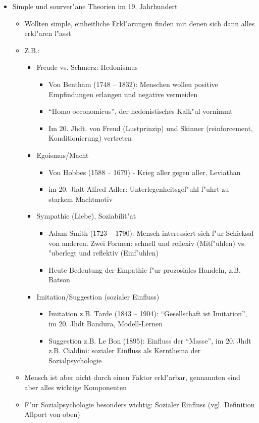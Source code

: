 \begin{itemize}
	\item
		Simple und sourver"ane Theorien im 19. Jahrhundert
		\begin{itemize}
			\item
				Wollten simple, einheitliche Erkl"arungen finden mit denen sich dann alles erkl"aren l"asst
			\item
				Z.B.:
				\begin{itemize}
					\item
						Freude vs. Schmerz: Hedonismus
						\begin{itemize}
							\item
								Von Bentham (1748 -- 1832): Menschen wollen positive Empfindungen erlangen und negative vermeiden
							\item
								\enquote{Homo oeconomicus}, der hedonistisches Kalk"ul vornimmt
							\item
								Im 20. Jhdt. von Freud (Lustprinzip) und Skinner (reinforcement, Konditionierung) vertreten
						\end{itemize}
					\item
						Egoismus/Macht
						\begin{itemize}
							\item
								Von Hobbes (1588 -- 1679) - Krieg aller gegen aller, Leviathan
							\item
								im 20. Jhdt Alfred Adler: Unterlegenheitsgef"uhl f"uhrt zu starkem Machtmotiv
						\end{itemize}
					\item
						Sympathie (Liebe), Soziabilit"at
						\begin{itemize}
							\item
								Adam Smith (1723 -- 1790): Mensch interessiert sich f"ur Schicksal von anderen. Zwei Formen: schnell und reflexiv (Mitf"uhlen) vs. "uberlegt und reflektiv (Einf"uhlen)
							\item
								Heute Bedeutung der Empathie f"ur prozosiales Handeln, z.B. Batson
						\end{itemize}
					\item
						Imitation/Suggestion (sozialer Einfluss)
						\begin{itemize}
							\item
								Imitation z.B. Tarde (1843 -- 1904): \enquote{Gesellschaft ist Imitation}, im 20. Jhdt Bandura, Modell-Lernen
							\item
								Suggestion z.B. Le Bon (1895): Einfluss der \enquote{Masse}, im 20. Jhdt z.B. Cialdini: sozialer Einfluss als Kernthema der Sozialpsychologie
						\end{itemize}
				\end{itemize}
			\item
				Mensch ist aber nicht durch einen Faktor erkl"arbar, gennannten sind aber alles wichtige Komponenten
			\item
				F"ur Sozialpsychologie besonders wichtig: Sozialer Einfluss (vgl. Definition Allport von oben)
		\end{itemize}

\end{itemize}


